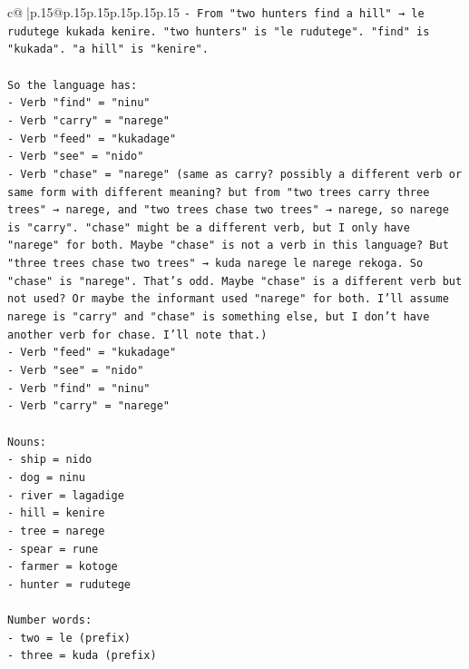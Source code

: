 \documentclass{article}
\begin{document}
{\begin{supertabular}{c@{$\;$}|p{.15\linewidth}@{}p{.15\linewidth}p{.15\linewidth}p{.15\linewidth}p{.15\linewidth}p{.15\linewidth}}
{{{\texttt{{-} From "two hunters find a hill" → le rudutege kukada kenire. "two hunters" is "le rudutege". "find" is "kukada". "a hill" is "kenire".} \\
\\ 
\texttt{So the language has:} \\
\texttt{{-} Verb "find" = "ninu"} \\
\texttt{{-} Verb "carry" = "narege"} \\
\texttt{{-} Verb "feed" = "kukadage"} \\
\texttt{{-} Verb "see" = "nido"} \\
\texttt{{-} Verb "chase" = "narege" (same as carry? possibly a different verb or same form with different meaning? but from "two trees carry three trees" → narege, and "two trees chase two trees" → narege, so narege is "carry". "chase" might be a different verb, but I only have "narege" for both. Maybe "chase" is not a verb in this language? But "three trees chase two trees" → kuda narege le narege rekoga. So "chase" is "narege". That's odd. Maybe "chase" is a different verb but not used? Or maybe the informant used "narege" for both. I'll assume narege is "carry" and "chase" is something else, but I don't have another verb for chase. I'll note that.)} \\
\texttt{{-} Verb "feed" = "kukadage"} \\
\texttt{{-} Verb "see" = "nido"} \\
\texttt{{-} Verb "find" = "ninu"} \\
\texttt{{-} Verb "carry" = "narege"} \\
\\ 
\texttt{Nouns:} \\
\texttt{{-} ship = nido} \\
\texttt{{-} dog = ninu} \\
\texttt{{-} river = lagadige} \\
\texttt{{-} hill = kenire} \\
\texttt{{-} tree = narege} \\
\texttt{{-} spear = rune} \\
\texttt{{-} farmer = kotoge} \\
\texttt{{-} hunter = rudutege} \\
\\ 
\texttt{Number words:} \\
\texttt{{-} two = le (prefix)} \\
\texttt{{-} three = kuda (prefix)} \\
\\ 
}}}
\end{supertabular}}
\end{document}
